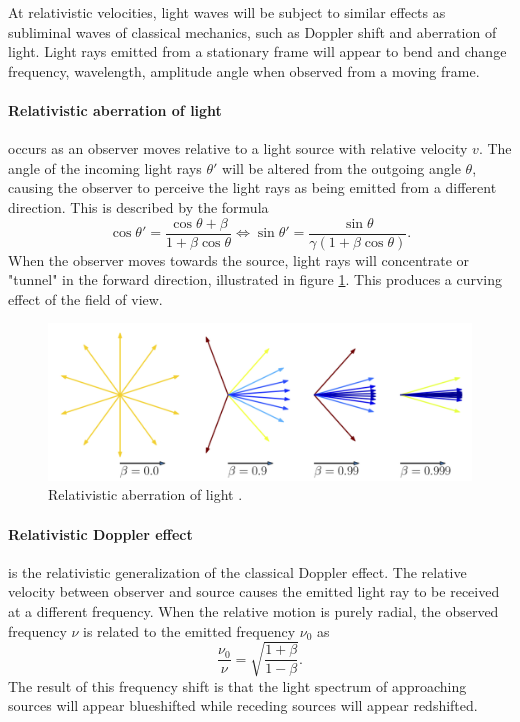 \documentclass[a4paper]{article}
\begin{document}
At relativistic velocities, light waves will be subject to similar effects as subliminal waves of classical mechanics, such as Doppler shift and aberration of light. Light rays emitted from a stationary frame will appear to bend and change frequency, wavelength, amplitude angle when observed from a moving frame.

\paragraph{Relativistic aberration of light} occurs as an observer moves relative to a light source with relative velocity $v$. The angle of the incoming light rays $\theta'$ will be altered from the outgoing angle $\theta$, causing the observer to perceive the light rays as being emitted from a different direction. This is described by the formula
\begin{equation*}
    \cos\theta' = \frac{\cos \theta + \beta}{1+\beta\cos\theta} \Leftrightarrow
    \sin \theta' = \frac{\sin \theta}{\gamma(1+\beta \cos \theta)}.
\end{equation*}
When the observer moves towards the source, light rays will concentrate or "tunnel" in the forward direction, illustrated in figure \ref{fig:aberration}. This produces a curving effect of the field of view.
\begin{figure}[ht]
    \centering
    \includegraphics[width=0.8\linewidth]{img/aberration.png}
    \caption{Relativistic aberration of light \cite{aberration}.}
    \label{fig:aberration}
\end{figure}

\paragraph{Relativistic Doppler effect} is the relativistic generalization of the classical Doppler effect. The relative velocity between observer and source causes the emitted light ray to be received at a different frequency. When the relative motion is purely radial, the observed frequency $\nu$ is related to the emitted frequency $\nu_{0}$ as
\begin{equation}
    \frac{\nu_{0}}{\nu} = \sqrt{\frac{1+\beta}{1-\beta}}.
\end{equation}
The result of this frequency shift is that the light spectrum of approaching sources will appear blueshifted while receding sources will appear redshifted.
\end{document}
